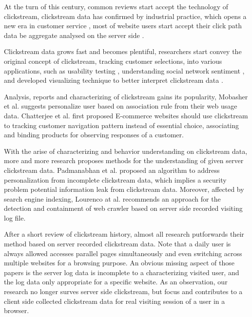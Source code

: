 At the turn of this century, common reviews start accept the technology of clickstream,
clickstream data has confirmed by industrial practice, which opens a new era in 
customer service \cite{walsh2000internet}, most of website users start accept their click path data 
be aggregate analysed on the server side \cite{carr2000hypermediation}.

Clickstream data grows fast and becomes plentiful, researchers start convey the original concept of clickstream,
tracking customer selections, into various applications, such as usability testing \cite{Waterson:2002:LOW:506443.506602},
understanding social network sentiment \cite{Schneider:2009:UOS:1644893.1644899}, and developed visualizing
technique to better interpret clickstream data \cite{Waterson:2002:DTU:1556262.1556276}.

Analysis, reports and characterizing of clickstream gains its popularity, Mobasher et al. \cite{Mobasher:2001:EPB:502932.502935}
suggests personalize user based on association rule from their web usage data. Chatterjee et al. \cite{chatterjee2003modeling} 
first proposed E-commerce websites should use clickstream to tracking customer navigation pattern instead of essential choice, 
associating and binding products for observing responses of a customer.

With the arise of characterizing and behavior understanding on clickstream data, more and more
research proposes methods for the understanding of given server clickstream data.
Padmanabhan et al. \cite{Padmanabhan:2001:PID:502512.502535}
proposed an algorithm to address personalization from incomplete clickstream data, which implies
a security problem potential information leak from clickstream data. 
Moreover, affected by search engine indexing, Lourenco at al. \cite{Lourenco:2006:CWC:1145581.1145634} recommends an approach for
the detection and containment of web crawler based on server side recorded visiting log file.

After a short review of clickstream history, almost all research putforwards their method based on
server recorded clickstream data. Note that a daily user is always allowed accesses parallel pages simultaneously and even
switching across multiple websites for a browsing purpose.
An obvious missing aspect of those papers is the server log data is incomplete to a characterizing visited user, 
and the log data only appropriate for a specific website. 
As an observation, our research no longer surves server side clickstream, 
but focus and contributes to a client side collected clickstream data for real visiting session of a user in a browser.

